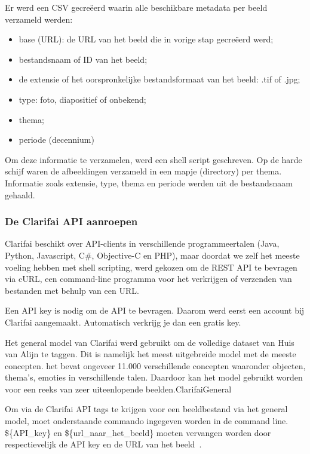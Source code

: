 Er werd een CSV gecreëerd waarin alle beschikbare metadata per beeld verzameld werden:
\begin{itemize}
	\item base (URL): de URL van het beeld die in vorige stap gecreëerd werd;
	\item bestandsnaam of ID van het beeld;
	\item de extensie of het oorspronkelijke bestandsformaat van het beeld: .tif of .jpg;
	\item type: foto, diapositief of onbekend;
	\item thema;
	\item periode (decennium)
\end{itemize}

Om deze informatie te verzamelen, werd een shell script geschreven. Op de harde schijf waren de afbeeldingen verzameld in een mapje (directory) per thema. Informatie zoals extensie, type, thema en periode werden uit de bestandsnaam gehaald. 

\subsubsection{De Clarifai API aanroepen}

Clarifai beschikt over API-clients in verschillende programmeertalen (Java, Python, Javascript, C\#, Objective-C en PHP), maar doordat we zelf het meeste voeling hebben met shell scripting, werd gekozen om de REST API te bevragen via cURL, een command-line programma voor het verkrijgen of verzenden van bestanden met behulp van  een URL.

Een API key is nodig om de API te bevragen. Daarom werd eerst een account bij Clarifai aangemaakt. Automatisch verkrijg je dan een gratis key. 


Het general model van Clarifai werd gebruikt om de volledige dataset van Huis van Alijn te taggen. Dit is namelijk het meest uitgebreide model met de meeste concepten. het bevat ongeveer 11.000 verschillende concepten waaronder objecten, thema's, emoties in verschillende talen. Daardoor kan het model gebruikt worden voor een reeks van zeer uiteenlopende beelden.{ClarifaiGeneral}

Om via de Clarifai API tags te krijgen voor een beeldbestand via het general model, moet onderstaande commando ingegeven worden in de command line. \$\{API\_key\} en \$\{url\_naar\_het\_beeld\} moeten vervangen worden door respectievelijk de API key en de URL van het beeld~\autocite{ClarifaiAPI}.

